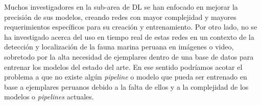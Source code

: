 Muchos investigadores en la sub-area de DL se han enfocado en mejorar la precisión de sus modelos, creando redes con mayor complejidad y mayores requerimientos específicos para su creación y entrenamiento. Por otro lado, no se ha investigado acerca del uso en tiempo real de estas redes en un contexto de la detección y localización de la fauna marina peruana en imágenes o video, sobretodo por la alta necesidad de ejemplares dentro de una base de datos para entrenar los modelos del estado del arte. En ese sentido podríamos acotar el problema a que no existe algún \textit{pipeline} o modelo que pueda ser entrenado en base a ejemplares peruanos debido a la falta de ellos y a la complejidad de los modelos o \textit{pipelines} actuales. 